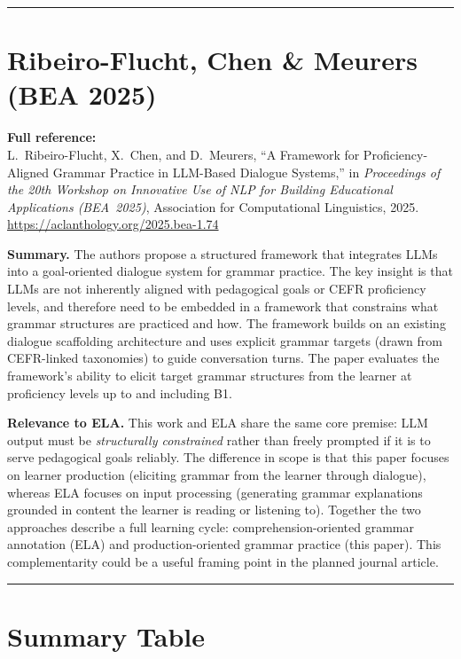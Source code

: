 \documentclass[12pt,a4paper]{article}
\begin{document}
\bigskip
\hrule
\bigskip

\section{Ribeiro-Flucht, Chen \& Meurers (BEA 2025)}

\textbf{Full reference:}\\
L.~Ribeiro-Flucht, X.~Chen, and D.~Meurers, ``A Framework for Proficiency-Aligned Grammar Practice in LLM-Based Dialogue Systems,'' in \textit{Proceedings of the 20th Workshop on Innovative Use of NLP for Building Educational Applications (BEA~2025)}, Association for Computational Linguistics, 2025.\\
\url{https://aclanthology.org/2025.bea-1.74}

\textbf{Summary.}
The authors propose a structured framework that integrates LLMs into a goal-oriented dialogue system for grammar practice. The key insight is that LLMs are not inherently aligned with pedagogical goals or CEFR proficiency levels, and therefore need to be embedded in a framework that constrains what grammar structures are practiced and how. The framework builds on an existing dialogue scaffolding architecture and uses explicit grammar targets (drawn from CEFR-linked taxonomies) to guide conversation turns. The paper evaluates the framework's ability to elicit target grammar structures from the learner at proficiency levels up to and including B1.

\textbf{Relevance to ELA.}
This work and ELA share the same core premise: LLM output must be \emph{structurally constrained} rather than freely prompted if it is to serve pedagogical goals reliably. The difference in scope is that this paper focuses on learner production (eliciting grammar from the learner through dialogue), whereas ELA focuses on input processing (generating grammar explanations grounded in content the learner is reading or listening to). Together the two approaches describe a full learning cycle: comprehension-oriented grammar annotation (ELA) and production-oriented grammar practice (this paper). This complementarity could be a useful framing point in the planned journal article.

\bigskip
\hrule
\bigskip

\section*{Summary Table}
\end{document}
